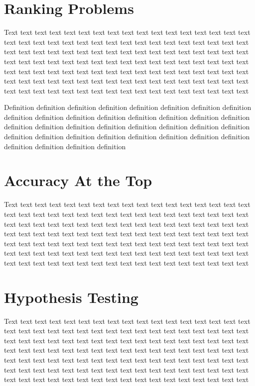 \documentclass{Thesis}
\begin{document}
\section{Ranking Problems}

Text \cite{adam2019machine,agarwal2011infinite} text text text text text text text text text text text text text text text text text text text text text text text text text text text text text text text text text text text text text text text text text text text text text text text text text text text text text text text text text text text text text text text text text text text text text text text text text text text text text text text text text text text text text text text text text text text text text text text text text text text text text text text text text text text text text text text text text text text text text text

\begin{definition}
  Definition definition definition definition definition definition definition definition definition definition definition definition definition definition definition definition definition definition definition definition definition definition definition definition definition definition definition definition definition definition definition definition definition definition definition definition
\end{definition}

\section{Accuracy At the Top}

Text text text text text text text text text text text text text text text text text text text text text text text text text text text text text text text text text text text text text text text text text text text text text text text text text text text text text text text text text text text text text text text text text text text text text text text text text text text text text text text text text text text text text text text text text text text text text text text text text text text text text text text text text text text text text text text text text text text text text text text

\section{Hypothesis Testing}

Text text text text text text text text text text text text text text text text text text text text text text text text text text text text text text text text text text text text text text text text text text text text text text text text text text text text text text text text text text text text text text text text text text text text text text text text text text text text text text text text text text text text text text text text text text text text text text text text text text text text text text text text text text text text text text text text text text text text text text text
\end{document}
